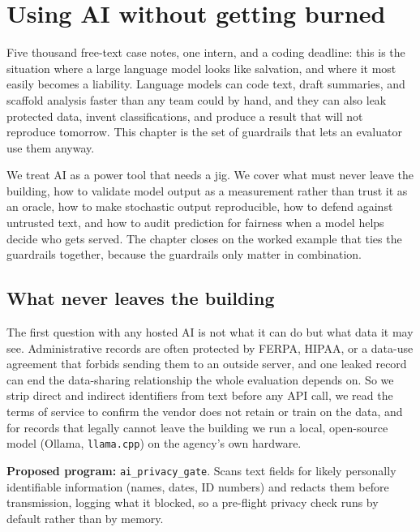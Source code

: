 \documentclass[
    a4paper,
    fontsize=10pt,
    twoside=true,
    numbers=noenddot,
]{kaobook}
\begin{document}


\chapter{Using AI without getting burned}\label{ch:ai}

Five thousand free-text case notes, one intern, and a coding deadline: this is the situation where a large language model looks like salvation, and where it most easily becomes a liability. Language models can code text, draft summaries, and scaffold analysis faster than any team could by hand, and they can also leak protected data, invent classifications, and produce a result that will not reproduce tomorrow. This chapter is the set of guardrails that lets an evaluator use them anyway.

We treat AI as a power tool that needs a jig. We cover what must never leave the building, how to validate model output as a measurement rather than trust it as an oracle, how to make stochastic output reproducible, how to defend against untrusted text, and how to audit prediction for fairness when a model helps decide who gets served. The chapter closes on the worked example that ties the guardrails together, because the guardrails only matter in combination.

\section{What never leaves the building}
The first question with any hosted AI is not what it can do but what data it may see. Administrative records are often protected by FERPA, HIPAA, or a data-use agreement that forbids sending them to an outside server, and one leaked record can end the data-sharing relationship the whole evaluation depends on. So we strip direct and indirect identifiers from text before any API call, we read the terms of service to confirm the vendor does not retain or train on the data, and for records that legally cannot leave the building we run a local, open-source model (Ollama, \texttt{llama.cpp}) on the agency's own hardware.

\begin{kaobox}[frametitle=Ado-file Idea: \texttt{ai\_privacy\_gate}]
\textbf{Proposed program:} \texttt{ai\_privacy\_gate}. Scans text fields for likely personally identifiable information (names, dates, ID numbers) and redacts them before transmission, logging what it blocked, so a pre-flight privacy check runs by default rather than by memory.
\end{kaobox}
\end{document}

